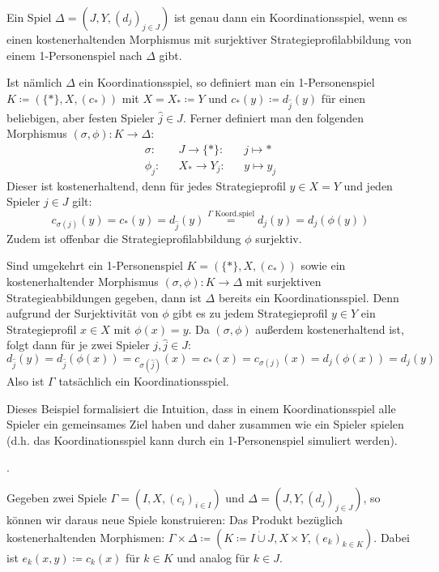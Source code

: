 \begin{bsp}\label{bsp:Koordinationsspiel}
	Ein Spiel $\Delta = (J, Y, (d_j)_{j \in J})$ ist genau dann ein Koordinationsspiel, wenn es einen kostenerhaltenden Morphismus mit surjektiver Strategieprofilabbildung von einem 1-Personenspiel nach $\Delta$ gibt.
	
	Ist nämlich $\Delta$ ein Koordinationsspiel, so definiert man ein 1-Personenspiel $K \coloneqq (\{\ast\}, X, (c_\ast))$ mit $X = X_\ast \coloneqq Y$ und $c_\ast(y) \coloneqq d_{\hat{j}}(y)$ für einen beliebigen, aber festen Spieler $\hat{j} \in J$. Ferner definiert man den folgenden Morphismus $(\sigma, \phi): K \to \Delta$:
	\begin{align*}
		\sigma:	&&J		\to	 \{\ast\}:	&&j	\mapsto	\ast  \\
		\phi_j:	&&X_\ast	\to	 Y_j:	&&y	\mapsto	y_j
	\end{align*}	
	Dieser ist kostenerhaltend, denn für jedes Strategieprofil $y \in X = Y$ und jeden Spieler $j \in J$ gilt:
	\[c_{\sigma(j)}(y) = c_\ast(y) = d_{\hat{j}}(y) \overset{\Gamma \text{ Koord.spiel}}{=} d_j(y) = d_j(\phi(y))\]
	Zudem ist offenbar die Strategieprofilabbildung $\phi$ surjektiv.
	
	Sind umgekehrt ein 1-Personenspiel $K = (\{\ast\}, X, (c_\ast))$ sowie ein kostenerhaltender Morphismus  $(\sigma, \phi): K \to \Delta$ mit surjektiven Strategieabbildungen gegeben, dann ist $\Delta$ bereits ein Koordinationsspiel. Denn aufgrund der Surjektivität von $\phi$ gibt es zu jedem Strategieprofil $y \in Y$ ein Strategieprofil $x \in X$ mit $\phi(x) = y$. Da $(\sigma, \phi)$ außerdem kostenerhaltend ist, folgt dann für je zwei Spieler $j, \hat{j} \in J$: 
		\[d_{\hat{j}}(y) = d_{\hat{j}}(\phi(x)) = c_{\sigma(\hat{j})}(x) = c_\ast(x) = c_{\sigma(j)}(x) = d_j(\phi(x)) = d_j(y)\]
	Also ist $\Gamma$ tatsächlich ein Koordinationsspiel.
\end{bsp}

Dieses Beispiel formalisiert die Intuition, dass in einem Koordinationsspiel alle Spieler ein gemeinsames Ziel haben und daher zusammen \glqq wie ein Spieler\grqq{} spielen (d.h. das Koordinationsspiel kann durch ein 1-Personenspiel simuliert werden).

\begin{bsp}.
	
\end{bsp}

\begin{bsp}
	Gegeben zwei Spiele $\Gamma = (I, X, (c_i)_{i\in I})$ und $\Delta = (J, Y, (d_j)_{j\in J})$, so können wir daraus neue Spiele konstruieren: Das Produkt bezüglich kostenerhaltenden Morphismen: $\Gamma \times \Delta \coloneqq (K \coloneqq I \dot{\cup} J, X\times Y, (e_k)_{k \in K})$. Dabei ist $e_k(x,y) \coloneqq c_k(x)$ für $k \in K$ und analog für $k \in J$. 
\end{bsp}


